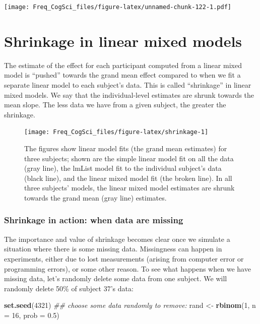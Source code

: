 \documentclass[12pt,]{krantz}
\newenvironment{Shaded}{\begin{snugshade}}{\end{snugshade}}
\newcommand{\CommentTok}[1]{\textcolor[rgb]{0.56,0.35,0.01}{\textit{#1}}}
\newcommand{\DataTypeTok}[1]{\textcolor[rgb]{0.13,0.29,0.53}{#1}}
\newcommand{\DecValTok}[1]{\textcolor[rgb]{0.00,0.00,0.81}{#1}}
\newcommand{\FloatTok}[1]{\textcolor[rgb]{0.00,0.00,0.81}{#1}}
\newcommand{\KeywordTok}[1]{\textcolor[rgb]{0.13,0.29,0.53}{\textbf{#1}}}
\newcommand{\NormalTok}[1]{#1}
\newcommand{\StringTok}[1]{\textcolor[rgb]{0.31,0.60,0.02}{#1}}
\begin{document}
\texttt{[image: Freq\_CogSci\_files/figure-latex/unnamed-chunk-122-1.pdf]}

\hypertarget{shrinkage-in-linear-mixed-models}{%
\section{Shrinkage in linear mixed models}\label{shrinkage-in-linear-mixed-models}}

The estimate of the effect for each participant computed from a linear mixed model is ``pushed'' towards the grand mean effect compared to when we fit a separate linear model to each subject's data.
This is called ``shrinkage'' in linear mixed models. We say that the individual-level estimates are shrunk towards the mean slope.
The less data we have from a given subject, the greater the shrinkage.

\begin{figure}
\texttt{[image: Freq\_CogSci\_files/figure-latex/shrinkage-1]} \caption{The figures show linear model fits (the grand mean estimates) for three subjects; shown are the simple linear model fit on all the data (gray line), the lmList model fit to the individual subject's data (black line), and the linear mixed model fit (the broken line). In all three subjects' models, the linear mixed model estimates are shrunk towards the grand mean (gray line) estimates.}\label{fig:shrinkage}
\end{figure}

\hypertarget{shrinkage-in-action-when-data-are-missing}{%
\subsubsection{Shrinkage in action: when data are missing}\label{shrinkage-in-action-when-data-are-missing}}

The importance and value of shrinkage becomes clear once we simulate a situation where there is some missing data. Missingness can happen in experiments, either due to lost measurements (arising from computer error or programming errors), or some other reason. To see what happens when we have missing data, let's randomly delete some data from one subject. We will randomly delete 50\% of subject 37's data:

\begin{Shaded}
\begin{Highlighting}[]
\KeywordTok{set.seed}\NormalTok{(}\DecValTok{4321}\NormalTok{)}
\CommentTok{## choose some data randomly to remove:}
\NormalTok{rand <-}\StringTok{ }\KeywordTok{rbinom}\NormalTok{(}\DecValTok{1}\NormalTok{, }\DataTypeTok{n =} \DecValTok{16}\NormalTok{, }\DataTypeTok{prob =} \FloatTok{0.5}\NormalTok{)}
\end{Highlighting}
\end{Shaded}
\end{document}
